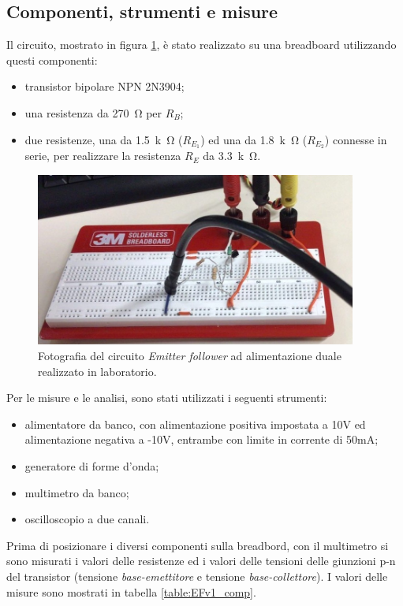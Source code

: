 \documentclass{report}
\begin{document}
\subsection{Componenti, strumenti e misure} 
Il circuito, mostrato in figura \ref{figura:fotoEFv1}, è stato realizzato su una breadboard utilizzando questi componenti:
\begin{itemize}
\item transistor bipolare NPN 2N3904;
\item una resistenza da \SI{270}{\ohm} per $R_B$;
\item due resistenze, una da \SI{1.5}{k\ohm} ($R_{E_1}$) ed una da \SI{1.8}{k\ohm} ($R_{E_2}$) connesse in serie, per realizzare la resistenza $R_E$ da \SI{3.3}{k\ohm}.
\end{itemize}
\begin{figure}[h]
\centering
\includegraphics[height=5.7cm]{immagini/fotoEFv1}
\caption{Fotografia del circuito \textit{Emitter follower} ad alimentazione duale realizzato in laboratorio.}
\label{figura:fotoEFv1}
\end{figure}
Per le misure e le analisi, sono stati utilizzati i seguenti strumenti:
\begin{itemize}
\item alimentatore da banco, con alimentazione positiva impostata a 10V ed alimentazione negativa a -10V, entrambe con limite in corrente di 50mA;
\item generatore di forme d'onda;
\item multimetro da banco;
\item oscilloscopio a due canali.
\end{itemize}
Prima di posizionare i diversi componenti sulla breadbord, con il multimetro si sono misurati i valori delle resistenze ed i valori delle tensioni delle giunzioni p-n del transistor (tensione \textit{base-emettitore} e tensione \textit{base-collettore}). I valori delle misure sono mostrati in tabella \ref{table:EFv1_comp}.
\end{document}
